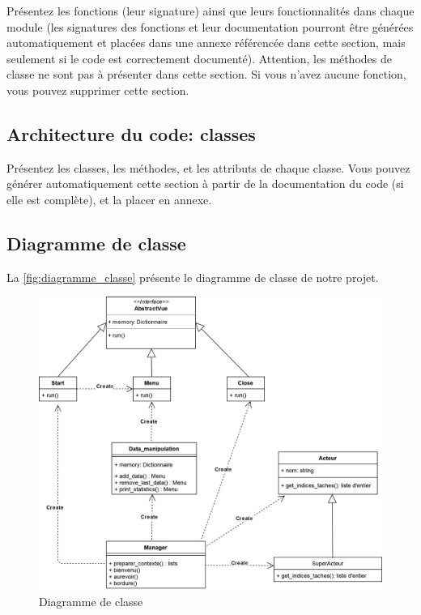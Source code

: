 \documentclass[11pt,a4paper]{article}
\begin{document}
Présentez les fonctions (leur signature) ainsi que leurs fonctionnalités dans chaque module (les signatures des fonctions et leur documentation pourront être générées automatiquement et placées dans une annexe référencée dans cette section, mais seulement si le code est correctement documenté).
Attention, les méthodes de classe ne sont pas à présenter dans cette section.
Si vous n'avez aucune fonction, vous pouvez supprimer cette section.

\subsection{Architecture du code: classes}

Présentez les classes, les méthodes, et les attributs de chaque classe.
Vous pouvez générer automatiquement cette section à partir de la documentation du code (si elle est complète), et la placer en annexe.

\subsection{Diagramme de classe}

La \autoref{fig:diagramme_classe} présente le diagramme de classe de notre projet.

\begin{figure}[tb]
  \centering
  \includegraphics[width=\linewidth]{diagramme_classe}
  \caption{Diagramme de classe}
  \label{fig:diagramme_classe}
\end{figure}
\end{document}
